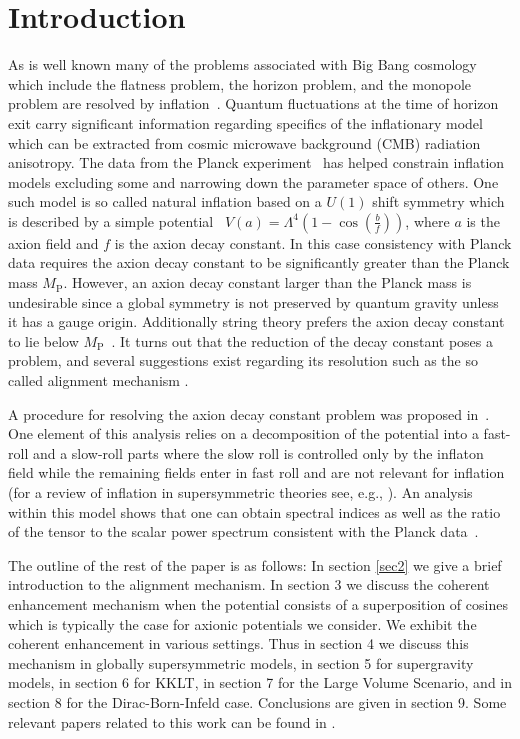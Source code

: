 \documentclass[12pt]{article}
\begin{document}
\section{Introduction \label{sec1}}
As is well known many of the problems associated with Big Bang cosmology which include
the flatness problem, the horizon problem, and the monopole problem are resolved by inflation~\cite{Guth:1980zm,Starobinsky:1980te,Linde:1981mu,Albrecht:1982wi,Sato,Linde:1983gd}.
Quantum fluctuations at the time of horizon exit carry significant information regarding specifics
of the inflationary model~\cite{Mukhanov+,Cheung:2007st}
which can be extracted from cosmic microwave background (CMB) radiation anisotropy.
The data from the Planck experiment~\cite{Adam:2015rua,Ade:2015lrj,Array:2015xqh} has helped
constrain inflation models excluding some and narrowing down the parameter space of others.
One such model is so called natural inflation based on a $U(1)$ shift symmetry
which is described by a simple potential~\cite{Freese:1990rb,Adams:1992bn}
$V(a) = \Lambda^4 \left(1- \cos(\frac{b}{f})\right)$,
where $a$ is the axion field and $f$ is the axion decay constant.
In this case consistency with Planck data requires the axion decay constant to be significantly greater than the Planck mass $M_\text{P}$.
However, an axion decay constant larger than the Planck mass is undesirable since a global symmetry is not preserved by quantum gravity
unless it has a gauge origin. Additionally string theory prefers the axion decay constant to lie below $M_\text{P}$~\cite{Banks:2003sx,Svrcek:2006yi}.
It turns out that the reduction of the decay constant poses a problem, and several suggestions exist regarding its resolution such as the
so called alignment mechanism \cite{Kim:2004rp,Long:2014dta}.

A procedure for resolving the axion decay constant problem was proposed in~\cite{Nath:2017ihp}.
One element of this analysis relies on a
decomposition of the potential into a fast-roll and a slow-roll parts where the slow roll is controlled only by the inflaton field while the remaining fields enter in fast roll and are not relevant for
inflation~\cite{Nath:2017ihp} (for a review of inflation in supersymmetric theories see, e.g., \cite{Nath:2016qzm}).
An analysis within this model shows that one can obtain
spectral indices as well as the ratio of the tensor to the scalar power spectrum consistent with the Planck data~\cite{Adam:2015rua,Ade:2015lrj,Array:2015xqh}.

The outline of the rest of the paper is as follows: In section \ref{sec2} we give a brief introduction to the alignment mechanism. In section 3
we discuss the coherent enhancement mechanism when the potential consists of a superposition of cosines which is typically the case
for axionic potentials we consider. We exhibit the coherent enhancement in various settings. Thus in section 4 we discuss this mechanism
in globally supersymmetric models, in section 5 for supergravity models, in section 6 for KKLT, in section 7 for the Large Volume
Scenario, and in section 8 for the Dirac-Born-Infeld case. Conclusions are given in section 9.
Some relevant papers related to this work can be found in \cite{BlancoPillado:2006he,Conlon:2005jm,Ben-Dayan:2014lca,Gao:2014uha}.
\end{document}
